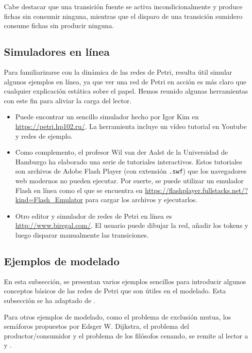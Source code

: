 Cabe destacar que una transición fuente se activa incondicionalmente y produce fichas sin
consumir ninguna, mientras que el disparo de una transición sumidero consume fichas sin
producir ninguna.

\subsection{Simuladores en línea}

Para familiarizarse con la dinámica de las redes de Petri, resulta útil simular algunos ejemplos
en línea, ya que ver una red de Petri en acción es más claro que cualquier explicación estática
sobre el papel. Hemos reunido algunas herramientas con este fin para aliviar la carga del lector.

\begin{itemize}
      \item Puede encontrar un sencillo simulador hecho por Igor Kim en \url{https://petri.hp102.ru/}.
            La herramienta incluye un vídeo tutorial en Youtube y redes de ejemplo.
      \item Como complemento, el profesor Wil van der Aalst de la Universidad de Hamburgo ha
            elaborado una serie de tutoriales interactivos. Estos tutoriales son archivos de Adobe
            Flash Player (con extensión
            \texttt{.swf}) que los navegadores web modernos no pueden ejecutar.
            Por suerte, se puede
            utilizar un emulador Flash en línea como el que se encuentra en \url{https://flashplayer.fullstacks.net/?kind=Flash_Emulator}
            para cargar los archivos
            y ejecutarlos.
      \item Otro editor y simulador de redes de Petri en línea es \url{http://www.biregal.com/}.
            El usuario puede dibujar la red, añadir los tokens y luego disparar manualmente las
            transiciones.
\end{itemize}

\subsection{Ejemplos de modelado}

En esta subsección, se presentan varios ejemplos sencillos para introducir algunos conceptos
básicos de las redes de Petri que son útiles en el modelado. Esta subsección se ha adaptado de
\cite{murata1989}.

Para otros ejemplos de modelado, como el problema de exclusión mutua, los semáforos
propuestos por Edsger W. Dijkstra, el problema del productor/consumidor y el problema de los
filósofos cenando, se remite al lector a \cite[Chap. 3]{peterson1981} y \cite{reisig2013}.

